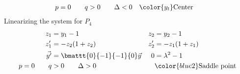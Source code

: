 \begin{enumerate}
\begin{align}
              p = 0 \qquad q & > 0 \qquad \Delta < 0          &
                             & \color{y_t} \text{Center}
          \end{align}
          Linearizing the system for $ P_4 $
          \begin{align}
              z_1            & = y_1 - 1                         &
              z_2            & = y_2 - 1                           \\
              z_1'           & = -z_2(1 + z_2)                   &
              z_2'           & = -z_1(1 + z_1)                     \\
              \vec{y'}       & = \bmattt{0}{-1}{-1}{0} \vec{y}   &
              0              & = \lambda^{2} - 1                   \\
              p = 0 \qquad q & > 0 \qquad \Delta > 0             &
                             & \color{blue2} \text{Saddle point}
          \end{align}


\end{enumerate}
